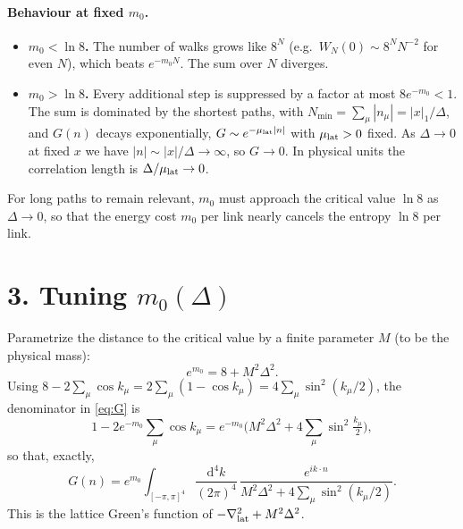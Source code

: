 \documentclass[11pt]{article}
\newcommand{\dd}{\mathrm{d}}
\begin{document}
\paragraph{Behaviour at fixed $m_0$.}
\begin{itemize}
\item \textbf{$m_0<\ln 8$.} The number of walks grows like $8^N$ (e.g.\ $W_N(0)\sim 8^N N^{-2}$ for even $N$),
which beats $e^{-m_0N}$. The sum over $N$ diverges.
\item \textbf{$m_0>\ln 8$.} Every additional step is suppressed by a factor at most
$8e^{-m_0}<1$. The sum is dominated by the shortest paths, with $N_{\min}=\sum_\mu|n_\mu|=|x|_1/\Delta$, and
$G(n)$ decays exponentially, $G\sim e^{-\mu_{\rm lat}|n|}$ with $\mu_{\rm lat}>0$ fixed. As $\Delta\to0$ at fixed
$x$ we have $|n|\sim|x|/\Delta\to\infty$, so $G\to0$. In physical units the correlation length is
$\Delta/\mu_{\rm lat}\to0$.
\end{itemize}
For long paths to remain relevant, $m_0$ must approach the critical value $\ln 8$ as $\Delta\to0$,
so that the energy cost $m_0$ per link nearly cancels the entropy $\ln 8$ per link.

\section*{3. Tuning $m_0(\Delta)$}

Parametrize the distance to the critical value by a finite parameter $M$ (to be the physical mass):
\begin{equation}
e^{m_0}=8+M^2\Delta^2 .
\label{eq:tune}
\end{equation}
Using $8-2\sum_\mu\cos k_\mu=2\sum_\mu(1-\cos k_\mu)=4\sum_\mu\sin^2(k_\mu/2)$, the denominator in
\eqref{eq:G} is
\begin{equation}
1-2e^{-m_0}\sum_\mu\cos k_\mu
=e^{-m_0}\Big(M^2\Delta^2+4\sum_{\mu}\sin^2\tfrac{k_\mu}{2}\Big),
\end{equation}
so that, exactly,
\begin{equation}
G(n)=e^{m_0}\int_{[-\pi,\pi]^4}\frac{\dd^4k}{(2\pi)^4}\,
\frac{e^{ik\cdot n}}{M^2\Delta^2+4\sum_\mu\sin^2(k_\mu/2)} .
\end{equation}
This is the lattice Green's function of $-\nabla^2_{\rm lat}+M^2\Delta^2$.
\end{document}
